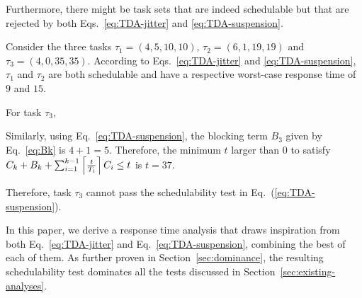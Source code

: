 Furthermore, there might be task sets that are indeed schedulable but that are rejected by both Eqs.~\eqref{eq:TDA-jitter} and \eqref{eq:TDA-suspension}.
 
\begin{example}  
Consider the three tasks $\tau_1 = (4, 5, 10, 10)$, $\tau_2 =(6, 1, 19, 19)$ and $\tau_3 = (4, 0, 35, 35)$. According to Eqs.~\eqref{eq:TDA-jitter} and \ref{eq:TDA-suspension}, $\tau_1$ and $\tau_2$ are both schedulable and have a respective worst-case response time of $9$ and $15$. 

For task $\tau_3$, 

Similarly, using Eq.~\eqref{eq:TDA-suspension}, the blocking term $B_3$ given by Eq.~\eqref{eq:Bk} is $4+1=5$. Therefore, the minimum $t$ larger than $0$ to satisfy $C_k + B_k +
\sum_{i=1}^{k-1}\left\lceil{\frac{t}{T_i}}\right\rceil C_i \leq t$ is $t=37$. 

Therefore, task $\tau_3$ cannot pass the schedulability test in Eq.~(\ref{eq:TDA-suspension}). 
\end{example}


In this paper, we derive a response time analysis that draws inspiration from both Eq.~\eqref{eq:TDA-jitter} and Eq.~\eqref{eq:TDA-suspension}, combining the best of each of them. As further proven in Section~\ref{sec:dominance}, the resulting schedulability test dominates all the tests discussed in Section~\ref{sec:existing-analyses}.

